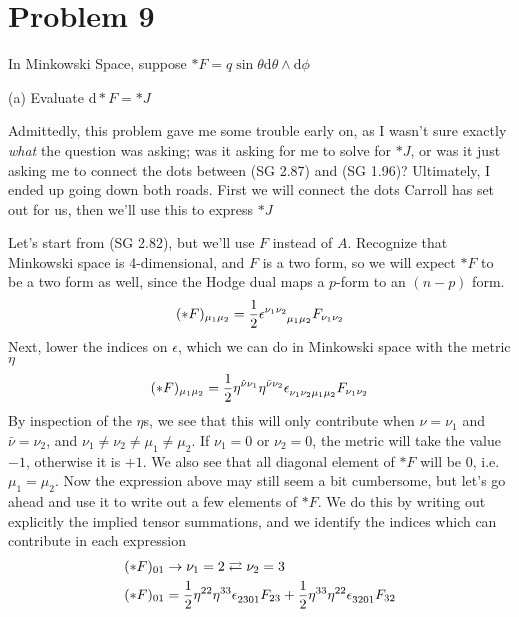 \section{Problem 9}
In Minkowski Space, suppose $ \ast F = q  \sin{\theta}  \textrm{d} \theta  \wedge  \textrm{d} \phi$

(a) Evaluate  $ \textrm{d} \ast F = \ast J $

Admittedly, this problem gave me some trouble early on, as I wasn't sure exactly \textit{what} the question was asking; was it asking for me to solve for $ \ast J $, or was it just asking me to connect the dots between (SG 2.87) and (SG 1.96)? Ultimately, I ended up going down both roads. First we will connect the dots Carroll has set out for us, then we'll use this to express $ \ast J $ 

Let's start from (SG 2.82), but we'll use $F$ instead of $A$. Recognize that Minkowski space is 4-dimensional, and $F$ is a two form, so we will expect $\ast F$ to be a two form as well, since the Hodge dual maps a $p$-form to an $(n-p)$ form. 
%
\begin{align}
	(\ast F)_{\mu_1 \mu_2} = \frac{1}{2} \epsilon\indices{^{{\nu_1}{\nu_2}}_{{\mu_1}{\mu_2}}} F_{\nu_1 \nu_2}
\end{align} 
%
Next, lower the indices on $\epsilon$, which we can do in Minkowski space with the metric $\eta$
%
\begin{align}
	(\ast F)_{\mu_1 \mu_2} = \frac{1}{2} \eta\indices{^{\hat{\nu}\nu_1}}  \eta\indices{^{\bar{\nu}\nu_2}} \epsilon\indices{_{{\nu_1}{\nu_2}{\mu_1}{\mu_2}}} F_{\nu_1 \nu_2}
\end{align} 
%
By inspection of the $\eta$s, we see that this will only contribute when $\hat{\nu} = \nu_1$ and $\bar{\nu} = \nu_2$, and $\nu_1 \neq \nu_2 \neq \mu_1 \neq \mu_2$. If $\nu_1=0$ or $\nu_2=0$, the metric will take the value $-1$, otherwise it is $+1$. We also see that all diagonal element of $\ast F$ will be $0$, i.e. $\mu_1 = \mu_2$. Now the expression above may still seem a bit cumbersome, but let's go ahead and use it to write out a few elements of $\ast F$. We do this by writing out explicitly the implied tensor summations, and we identify the indices which can contribute in each expression
%
\begin{align}
	&(\ast F)_{0 1} \rightarrow \nu_1 = 2 \rightleftarrows \nu_2 = 3 \\
	&(\ast F)_{0 1} = \frac{1}{2} \eta\indices{^{22}}  \eta\indices{^{33}} \epsilon\indices{_{2301}} F_{23} + \frac{1}{2} \eta\indices{^{33}}  \eta\indices{^{22}} \epsilon\indices{_{3201}} F_{32}
\end{align}
